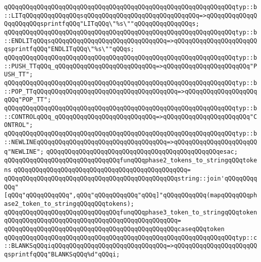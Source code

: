 \verb|qQQqqQQqqQQqqQQqqQQqqQQqqQQqqQQqqQQqqQQqqQQqqQQqqQQqqQQqqQQqqQQqtyp::b::LITqQQqqQQqqQQqqQQqsqQQqqQQqqQQqqQQqqQQqqQQqqQQqqQQq=>qQQqqQQqqQQqqQQqqQQqqQQqsprintfqQQq"LITqQQq\"%s\""qQQqqQQqqQQqqQQqs;|\newline
\verb|qQQqqQQqqQQqqQQqqQQqqQQqqQQqqQQqqQQqqQQqqQQqqQQqqQQqqQQqqQQqqQQqtyp::b::ENDLITqQQqsqQQqqQQqqQQqqQQqqQQqqQQqqQQqqQQq=>qQQqqQQqqQQqqQQqqQQqqQQqsprintfqQQq"ENDLITqQQq\"%s\""qQQqs;|\newline
\verb|qQQqqQQqqQQqqQQqqQQqqQQqqQQqqQQqqQQqqQQqqQQqqQQqqQQqqQQqqQQqqQQqtyp::b::PUSH_TTqQQq_qQQqqQQqqQQqqQQqqQQqqQQqqQQq=>qQQqqQQqqQQqqQQqqQQqqQQq"PUSH_TT";|\newline
\verb|qQQqqQQqqQQqqQQqqQQqqQQqqQQqqQQqqQQqqQQqqQQqqQQqqQQqqQQqqQQqqQQqtyp::b::POP_TTqQQqqQQqqQQqqQQqqQQqqQQqqQQqqQQqqQQqqQQq=>qQQqqQQqqQQqqQQqqQQqqQQq"POP_TT";|\newline
\verb|qQQqqQQqqQQqqQQqqQQqqQQqqQQqqQQqqQQqqQQqqQQqqQQqqQQqqQQqqQQqqQQqtyp::b::CONTROLqQQq_qQQqqQQqqQQqqQQqqQQqqQQqqQQq=>qQQqqQQqqQQqqQQqqQQqqQQq"CONTROL";|\newline
\verb|qQQqqQQqqQQqqQQqqQQqqQQqqQQqqQQqqQQqqQQqqQQqqQQqqQQqqQQqqQQqqQQqtyp::b::NEWLINEqQQqqQQqqQQqqQQqqQQqqQQqqQQqqQQqqQQq=>qQQqqQQqqQQqqQQqqQQqqQQq"NEWLINE";|\newline
\verb|qQQqqQQqqQQqqQQqqQQqqQQqqQQqqQQqqQQqqQQqqQQqqQQqesac;|\newline
\newline
\verb|qQQqqQQqqQQqqQQqqQQqqQQqqQQqqQQqfunqQQqphase2_tokens_to_stringqQQqtokens|\newline
\verb|qQQqqQQqqQQqqQQqqQQqqQQqqQQqqQQqqQQqqQQqqQQqqQQq=|\newline
\verb|qQQqqQQqqQQqqQQqqQQqqQQqqQQqqQQqqQQqqQQqqQQqqQQqstring::join'qQQqqQQqqQQq"[qQQq"qQQqqQQqqQQq",qQQq"qQQqqQQqqQQq"qQQq]"qQQqqQQqqQQq(mapqQQqqQQqphase2_token_to_stringqQQqqQQqtokens);|\newline
\newline
\newline
\verb|qQQqqQQqqQQqqQQqqQQqqQQqqQQqqQQqfunqQQqphase3_token_to_stringqQQqtoken|\newline
\verb|qQQqqQQqqQQqqQQqqQQqqQQqqQQqqQQqqQQqqQQqqQQqqQQq=|\newline
\verb|qQQqqQQqqQQqqQQqqQQqqQQqqQQqqQQqqQQqqQQqqQQqqQQqcaseqQQqtoken|\newline
\verb|qQQqqQQqqQQqqQQqqQQqqQQqqQQqqQQqqQQqqQQqqQQqqQQqqQQqqQQqqQQqqQQqtyp::c::BLANKSqQQqiqQQqqQQqqQQqqQQqqQQqqQQqqQQqqQQq=>qQQqqQQqqQQqqQQqqQQqqQQqsprintfqQQq"BLANKSqQQq%d"qQQqi;|\newline
